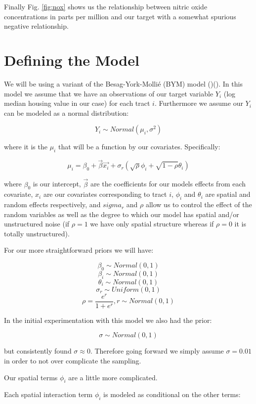 \documentclass[11pt]{article}
\begin{document}
Finally Fig. \ref{fig:nox} shows us the relationship between nitric oxide concentrations in parts per million and our target with a somewhat spurious negative relationship. 

\newpage


\section{Defining the Model}

We will be using a variant of the Besag-York-Mollié (BYM) model (\cite{book})(\cite{bymstan}). In this model we assume that we have an observations of our target variable $Y_i$ (log median housing value in our case) for each tract $i$. Furthermore we assume our $Y_i$ can be modeled as a normal distribution:

$$Y_i \sim Normal(\mu_i, \sigma^2)$$

where it is the $\mu_i$ that will be a function by our covariates. Specifically:

$$\mu_i= \beta_0 + \vec{\beta} \vec{x_i} + \sigma_r\left( \sqrt{\rho}\phi_i + \sqrt{1-\rho}\theta_i \right)$$

where $\beta_0$ is our intercept, $\vec{\beta}$ are the coefficients for our models effects from each covariate, $x_i$ are our covariates corresponding to tract $i$, $\phi_i$ and $\theta_i$ are spatial and random effects respectively, and $sigma_r$ and $\rho$ allow us to control the effect of the random variables as well as the degree to which our model has spatial and/or unstructured noise (if $\rho=1$ we have only spatial structure whereas if $\rho=0$ it is totally unstructured). 

For our more straightforward priors we will have:

$$\beta_0 \sim Normal(0,1)$$
$$\beta_i \sim Normal(0,1)$$
$$\theta_i \sim Normal(0,1)$$
$$\sigma_r \sim Uniform(0,1)$$
$$\rho = \frac{e^{r}}{1 + e^{r}}, r\sim Normal(0,1)$$

In the initial experimentation with this model we also had the prior:


$$\sigma \sim Normal(0,1)$$

but consistently found $\sigma \approx 0$. Therefore going forward we simply assume $\sigma=0.01$ in order to not over complicate the sampling. 

Our spatial terms $\phi_i$ are a little more complicated. \newline

Each spatial interaction term $\phi_i$ is modeled as conditional on the other terms:
\end{document}
